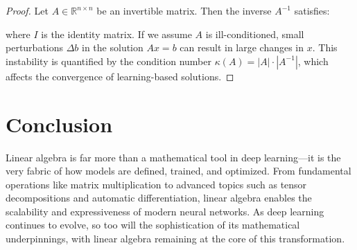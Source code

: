 \documentclass{article}
\begin{document}
\begin{proof}
Let $A \in \mathbb{R}^{n \times n}$ be an invertible matrix. Then the inverse $A^{-1}$ satisfies:

where $I$ is the identity matrix. If we assume $A$ is ill-conditioned, small perturbations $\Delta b$ in the solution $Ax = b$ can result in large changes in $x$. This instability is quantified by the condition number $\kappa(A) = |A| \cdot |A^{-1}|$, which affects the convergence of learning-based solutions.
\end{proof}


\section*{Conclusion}
Linear algebra is far more than a mathematical tool in deep learning—it is the very fabric of how models are defined, trained, and optimized. From fundamental operations like matrix multiplication to advanced topics such as tensor decompositions and automatic differentiation, linear algebra enables the scalability and expressiveness of modern neural networks. As deep learning continues to evolve, so too will the sophistication of its mathematical underpinnings, with linear algebra remaining at the core of this transformation. 

\pagebreak


\end{document}
